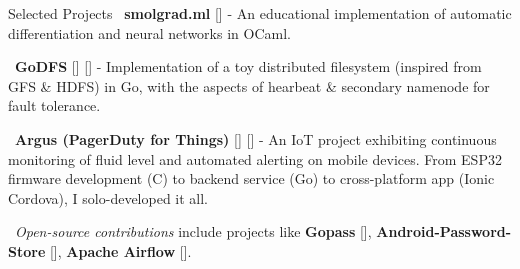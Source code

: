\documentclass{resume}
\begin{document}
\begin{rSection}{Selected Projects}
  \textbullet\ \textbf{\textsf{smolgrad.ml}} [\textbf{\href{https://github.com/rounakdatta/smolgrad.ml}{}}] - An educational implementation of automatic differentiation and neural networks in OCaml.

  \textbullet\ \textbf{\textsf{GoDFS}} [\textbf{\href{https://rounakdatta.github.io/posts/godfs}{}}] [\textbf{\href{https://github.com/rounakdatta/GoDFS}{}}] - Implementation of a toy distributed filesystem (inspired from GFS \& HDFS) in Go, with the aspects of hearbeat \& secondary namenode for fault tolerance.

  \textbullet\ \textbf{\textsf{Argus (PagerDuty for Things)}} [\textbf{\href{https://rounakdatta.github.io/posts/pagerduty-for-iot}{}}] [\textbf{\href{https://github.com/rounakdatta?tab=repositories&q=argus}{}}] - An IoT project exhibiting continuous monitoring of fluid level and automated alerting on mobile devices. From ESP32 firmware development (C) to backend service (Go) to cross-platform app (Ionic Cordova), I solo-developed it all.

  \textbullet\ \emph{Open-source contributions} include projects like \textbf{\textsf{Gopass}} [\textbf{\href{https://github.com/gopasspw/gopassbridge}{}}], \textbf{\textsf{Android-Password-Store}} [\textbf{\href{https://github.com/android-password-store/Android-Password-Store}{}}], \textbf{\textsf{Apache Airflow}} [\textbf{\href{https://github.com/apache/airflow}{}}].

\end{rSection}
\end{document}
